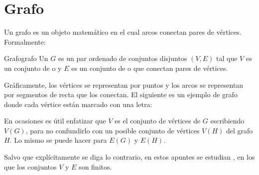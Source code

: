 \section{Grafo}
\label{sec:grafo}

Un grafo es un objeto matemático en el cual arcos conectan pares de vértices. Formalmente:

\begin{definicion}{Grafo}{grafo}
  Un  \(G\) es un par ordenado de conjuntos disjuntos \((V, E)\) tal que \(V\) es un conjunto de  o  y \(E\) es un conjunto de  o  que conectan pares de vértices.
\end{definicion}

Gráficamente, los vértices se representan por puntos y los arcos se representan por segmentos de recta que los conectan. El siguiente es un ejemplo de grafo donde cada vértice están marcado con una letra:

\begin{center}
\end{center}

En ocasiones es útil enfatizar que \(V\) es el conjunto de vértices de \(G\) escribiendo \(V(G)\), para no confundirlo con un posible conjunto de vértices \(V(H)\) del grafo \(H\). Lo mismo se puede hacer para \(E(G)\) y \(E(H)\).

Salvo que explícitamente se diga lo contrario, en estos apuntes se estudian , en los que los conjuntos \(V\) y \(E\) son finitos.